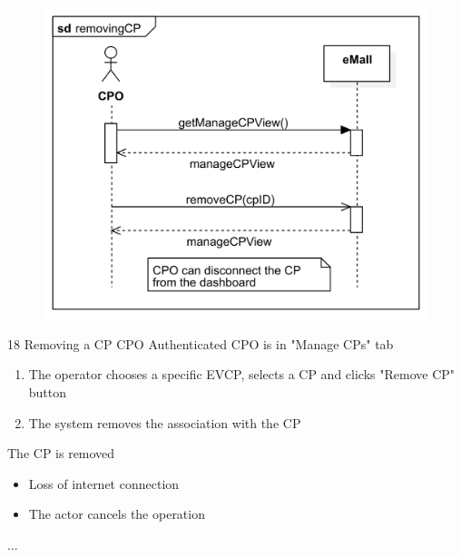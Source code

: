 \usecase
{
    \begin{figure}[H]
        \centering
        \includegraphics[scale=0.9]{src/sequence_diagram/removingCP.png}
    \end{figure}
}
{18}
{Removing a CP} %
{CPO} %
{Authenticated CPO is in "Manage CPs" tab} %
{ %
    \begin{enumerate}
        \item The operator chooses a specific EVCP, selects a CP and clicks "Remove CP" button
        \item The system removes the association with the CP
    \end{enumerate}
}
{The CP is removed} %
{ %
    \begin{itemize}
        \item Loss of internet connection
        \item The actor cancels the operation
    \end{itemize}
}
{ %
    ...
}

